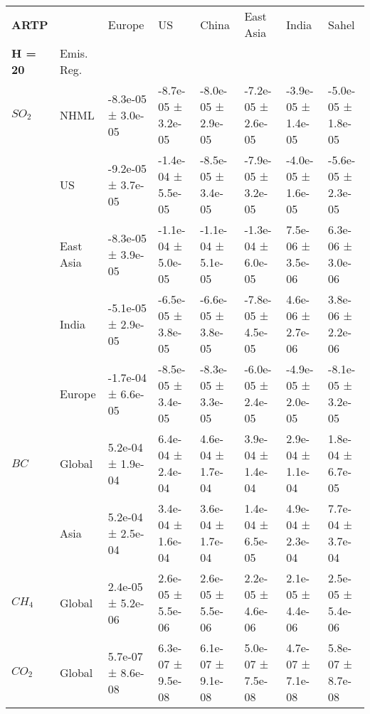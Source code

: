 \documentclass[preview]{standalone}
\newcommand{\nm}{\phantom{-}}
\begin{document}
	\tiny
	\begin{minipage}{\textwidth}
		\setlength\tabcolsep{5pt}
		\begin{tabular}{llllllll}
			\toprule
			\textbf{ARTP}        &        &               Europe &                   US &                China &            East Asia &                India &                Sahel \\
			\textbf{H = 20}  & Emis. Reg. &                      &                      &                      &                      &                      &                      \\
			\midrule
$SO_2$ & NHML &  -8.3e-05 ±  3.0e-05 &  -8.7e-05 ±  3.2e-05 &  -8.0e-05 ±  2.9e-05 &  -7.2e-05 ±  2.6e-05 &  -3.9e-05 ±  1.4e-05 &  -5.0e-05 ±  1.8e-05 \\
       & US &  -9.2e-05 ±  3.7e-05 &  -1.4e-04 ±  5.5e-05 &  -8.5e-05 ±  3.4e-05 &  -7.9e-05 ±  3.2e-05 &  -4.0e-05 ±  1.6e-05 &  -5.6e-05 ±  2.3e-05 \\
       & East Asia &  -8.3e-05 ±  3.9e-05 &  -1.1e-04 ±  5.0e-05 &  -1.1e-04 ±  5.1e-05 &  -1.3e-04 ±  6.0e-05 &   \nm7.5e-06 ±  3.5e-06 &   \nm6.3e-06 ±  3.0e-06 \\
       & India &  -5.1e-05 ±  2.9e-05 &  -6.5e-05 ±  3.8e-05 &  -6.6e-05 ±  3.8e-05 &  -7.8e-05 ±  4.5e-05 &   \nm4.6e-06 ±  2.7e-06 &   \nm3.8e-06 ±  2.2e-06 \\
       & Europe &  -1.7e-04 ±  6.6e-05 &  -8.5e-05 ±  3.4e-05 &  -8.3e-05 ±  3.3e-05 &  -6.0e-05 ±  2.4e-05 &  -4.9e-05 ±  2.0e-05 &  -8.1e-05 ±  3.2e-05 \\
\cmidrule(lr){1-8}
$BC$ & Global &   \nm5.2e-04 ±  1.9e-04 &   \nm6.4e-04 ±  2.4e-04 &   \nm4.6e-04 ±  1.7e-04 &   \nm3.9e-04 ±  1.4e-04 &   \nm2.9e-04 ±  1.1e-04 &   \nm1.8e-04 ±  6.7e-05 \\
       & Asia &   \nm5.2e-04 ±  2.5e-04 &   \nm3.4e-04 ±  1.6e-04 &   \nm3.6e-04 ±  1.7e-04 &   \nm1.4e-04 ±  6.5e-05 &   \nm4.9e-04 ±  2.3e-04 &   \nm7.7e-04 ±  3.7e-04 \\
\cmidrule(lr){1-8}
$CH_4$ & Global &   \nm2.4e-05 ±  5.2e-06 &   \nm2.6e-05 ±  5.5e-06 &   \nm2.6e-05 ±  5.5e-06 &   \nm2.2e-05 ±  4.6e-06 &   \nm2.1e-05 ±  4.4e-06 &   \nm2.5e-05 ±  5.4e-06 \\
\cmidrule(lr){1-8}
$CO_2$ & Global &   \nm5.7e-07 ±  8.6e-08 &   \nm6.3e-07 ±  9.5e-08 &   \nm6.1e-07 ±  9.1e-08 &   \nm5.0e-07 ±  7.5e-08 &   \nm4.7e-07 ±  7.1e-08 &   \nm5.8e-07 ±  8.7e-08 \\
\bottomrule
\end{tabular}

        \end{minipage}
        
\end{document}
